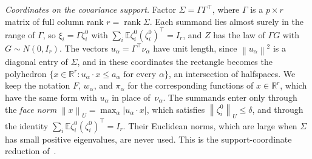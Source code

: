 \documentclass[11pt,letterpaper]{article}
\newif\ifshowrev
\newenvironment{revblock}{\ifshowrev\color{revblue}%
\hypersetup{linkcolor=revblue,citecolor=revblue,urlcolor=revblue}\fi}{}
\newif\ifshownat
\newcommand{\nat}[1]{\ifshownat{\color{revblue}%
\hypersetup{linkcolor=revblue,citecolor=revblue,urlcolor=revblue}#1}\else#1\fi}
\theoremstyle{remark}
\newcommand{\E}{\mathbb E}
\newcommand{\R}{\mathbb R}
\newcommand{\norm}[1]{\left\lVert#1\right\rVert}
\begin{document}
\begin{revblock}
\emph{Coordinates on the covariance support.} Factor
\(\Sigma=\Gamma\Gamma^\top\), where \(\Gamma\) is a \(p\times r\) matrix of
full column rank \(r=\operatorname{rank}\Sigma\). Each summand lies almost
surely in the range of \(\Gamma\), so \(\xi_i=\Gamma\zeta_i^0\) with
\(\sum_i\E\zeta_i^0(\zeta_i^0)^\top=I_r\), and \(Z\) has the law of
\(\Gamma G\) with \(G\sim N(0,I_r)\). The vectors
\(u_\alpha=\Gamma^\top\nu_\alpha\) have unit length, since
\(\norm{u_\alpha}^2\) is a diagonal entry of \(\Sigma\), and in these
coordinates the rectangle becomes the polyhedron
\(\{x\in\R^r:u_\alpha\cdot x\le a_\alpha\text{ for every }\alpha\}\), an
intersection of halfspaces. We keep the notation \(F\), \(w_\alpha\), and
\(\pi_\alpha\) for the corresponding functions of \(x\in\R^r\), which have
the same form with \(u_\alpha\) in place of~\(\nu_\alpha\). The summands enter
only through the \emph{face norm} \(\norm x_U=\max_\alpha|u_\alpha\cdot x|\),
which satisfies \(\norm{\zeta_i^0}_U\le\delta\), and through the identity
\(\sum_i\E\zeta_i^0(\zeta_i^0)^\top=I_r\). Their Euclidean norms, which are
large when \(\Sigma\) has small positive eigenvalues, are never used.
\nat{This is the support-coordinate reduction of~\cite[Section~2.3]{GaoZhang}.}


\end{revblock}
\end{document}
